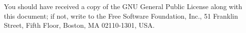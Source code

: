 \documentclass[a4paper,10pt]{book}
\newcommand{\ind}[1]{\begin{latexonly}\index{#1}\end{latexonly}}
\newcommand{\bracehack}{\def\{{\char"7B}\def\}{\char"7D}}
\newcommand{\titem}[1]{\item[\bracehack\texttt{#1}]}
\newcommand{\Jabber}{Jabber}
\begin{document}
You should have received a copy of the GNU General Public License along with
this document; if not, write to the Free Software Foundation, Inc., 51 Franklin
Street, Fifth Floor, Boston, MA 02110-1301, USA.






\begin{latexonly}
\printindex
\end{latexonly}
\end{document}
